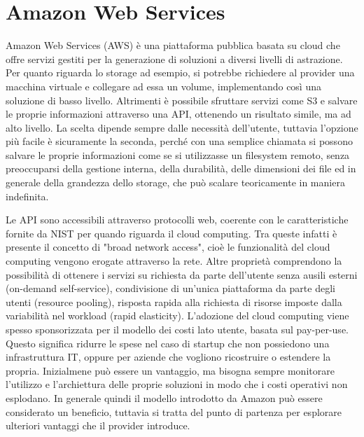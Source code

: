 \section{Amazon Web Services}
Amazon Web Services (AWS) è una piattaforma pubblica basata su cloud che offre servizi gestiti per la generazione di soluzioni a diversi livelli di astrazione. Per quanto riguarda lo storage ad esempio, si potrebbe richiedere al provider una macchina virtuale e collegare ad essa un volume, implementando così una soluzione di basso livello. Altrimenti è possibile sfruttare servizi come S3 e salvare le proprie informazioni attraverso una API, ottenendo un risultato simile, ma ad alto livello. La scelta dipende sempre dalle necessità dell'utente, tuttavia l'opzione più facile è sicuramente la seconda, perché con una semplice chiamata si possono salvare le proprie informazioni come se si utilizzasse un filesystem remoto, senza preoccuparsi della gestione interna, della durabilità, delle dimensioni dei file ed in generale della grandezza dello storage, che può scalare teoricamente in maniera indefinita. %

Le API sono accessibili attraverso protocolli web, coerente con le caratteristiche fornite da NIST per quando riguarda il cloud computing. Tra queste infatti è presente il concetto di "broad network access", cioè le funzionalità del cloud computing vengono erogate attraverso la rete. Altre proprietà comprendono la possibilità di ottenere i servizi su richiesta da parte dell'utente senza ausili esterni (on-demand self-service), condivisione di un'unica piattaforma da parte degli utenti (resource pooling), risposta rapida alla richiesta di risorse imposte dalla variabilità nel workload (rapid elasticity).  
L'adozione del cloud computing viene spesso sponsorizzata per il modello dei costi lato utente, basata sul pay-per-use. Questo significa ridurre le spese nel caso di startup che non possiedono una infrastruttura IT, oppure per aziende che vogliono ricostruire o estendere la propria. Inizialmene può essere un vantaggio, ma bisogna sempre monitorare l'utilizzo e l'archiettura delle proprie soluzioni in modo che i costi operativi non esplodano. In generale quindi il modello introdotto da Amazon può essere considerato un beneficio, tuttavia si tratta del punto di partenza per esplorare ulteriori vantaggi che il provider introduce. 

